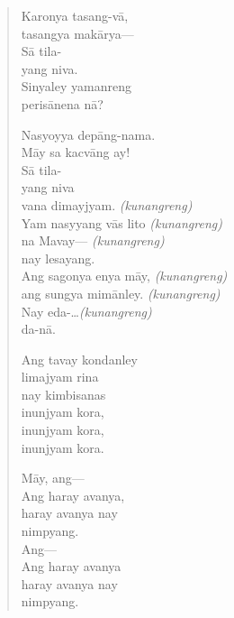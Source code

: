 \documentclass[12pt,paper=a4]{scrartcl}
\begin{document}
\begin{quote}
\begin{multicols}{2}
Karonya tasang-vā,\\
tasangya makārya---\\
Sā tila-\\
yang niva.\\
Sinyaley yamanreng\\
perisānena nā?

Nasyoyya depāng-nama.\\
Māy sa kacvāng ay!\\
Sā tila-\\
yang niva\\
vana dimayjyam.			\tab \textit{(kunangreng)}\\
Yam nasyyang vās lito	\tab \textit{(kunangreng)}\\
na Mavay---				\tab \textit{(kunangreng)}\\
nay lesayang.\\
Ang sagonya enya māy,	\tab \textit{(kunangreng)}\\
ang sungya mimānley.	\tab \textit{(kunangreng)}\\
Nay eda-\dots			\tab \textit{(kunangreng)}\\
da-nā.

\columnbreak

Ang tavay kondanley\\
limajyam rina\\
nay kimbisanas\\
inunjyam kora,\\
inunjyam kora,\\
inunjyam kora.

Māy, ang---\\
Ang haray avanya,\\
haray avanya nay\\
nimpyang.\\
Ang---\\
Ang haray avanya\\
haray avanya nay\\
nimpyang.
\end{multicols}



\end{quote}
\end{document}
